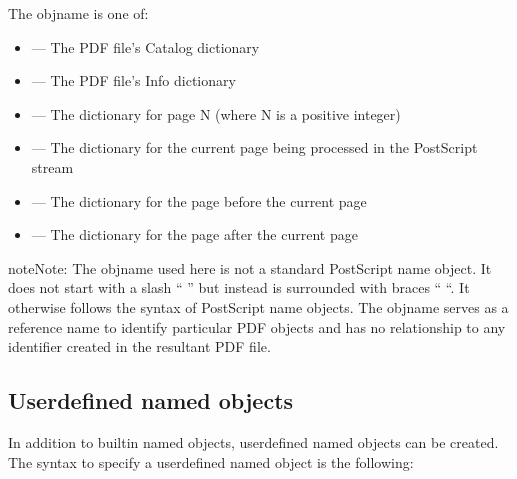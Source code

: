 \documentclass[letterpaper,12pt,english,openany,oneside]{sphinxmanual}
\begin{document}
\begin{sphinxVerbatim}[commandchars=\\\{\}]
\end{sphinxVerbatim}

The objname is one of:
\begin{itemize}
\item {} 
 — The PDF file’s Catalog dictionary

\item {} 
 — The PDF file’s Info dictionary

\item {} 
  — The dictionary for page N (where N is a positive integer)

\item {} 
 — The dictionary for the current page being processed in the PostScript stream

\item {} 
 — The dictionary for the page before the current page

\item {} 
 — The dictionary for the page after the current page

\end{itemize}

\begin{sphinxadmonition}{note}{Note:}
The objname used here is not a standard PostScript name object. It does not start with a slash “\sphinxcode{\sphinxupquote{/}} ” but instead is surrounded with braces “\sphinxcode{\sphinxupquote{\{\}}} “. It otherwise follows the syntax of PostScript name objects. The objname serves as a reference name to identify particular PDF objects and has no relationship to any identifier created in the resultant PDF file.
\end{sphinxadmonition}


\subsection{User\sphinxhyphen{}defined named objects}
\label{\detokenize{pdfmark_Syntax:user-defined-named-objects}}
In addition to built\sphinxhyphen{}in named objects, user\sphinxhyphen{}defined named objects can be created. The syntax to specify a user\sphinxhyphen{}defined named object is the following:
\end{document}
